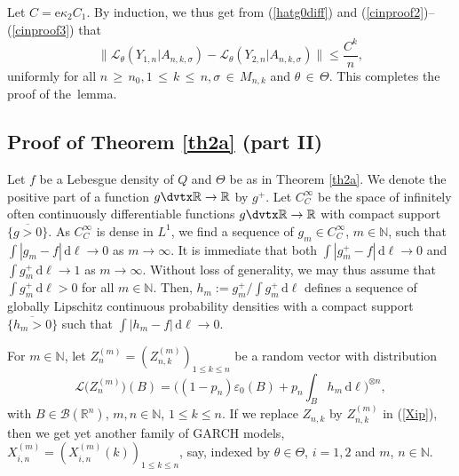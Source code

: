 \documentclass[number,citesort,seceqn,dvips]{arxbj}
\newcommand{\eqref}[1]{(\ref{#1})}
\newcommand{\RR}{\mathbb{R}}
\newcommand{\NN}{\mathbb{N}}
\newcommand{\BBB}{{\mathcal B}}
\newcommand{\LLL}{{\mathcal L}}
\begin{document}
\begin{pf}
Let $C=\mathrm{e} \kappa_2 C_1$. By induction, we thus get from
\eqref{hatg0diff} and \eqref{cinproof2}--\eqref{cinproof3} that
%
\[
\bigl \|\LLL_\theta (Y_{1,n} |A_{n,k,\sigma} )-\LLL
_\theta (Y_{2,n} |A_{n,k,\sigma} ) \bigr\|
\le\frac{C^k}{n} ,
\]
%
uniformly for all $n\,{\ge}\,n_0, 1\,{\le}\,k\,{\le}\,n, \sigma\,{\in}\,M_{n,k}$
and $\theta\,{\in}\,\Theta$. This completes the proof of the~lemma.\vspace*{-3pt}
\end{pf}

%

\subsection{\texorpdfstring{Proof of Theorem \protect\ref{th2a} (part II)}
{Proof of Theorem 2.2 (part II)}}\vspace*{-3pt}
\label{SUBSECproofThm2aPartII}
Let $f$ be a Lebesgue density of $Q$ and $\Theta$ be as in
Theorem \ref{th2a}. We denote the positive part of a function
$g\dvtx\RR\to\RR$ by $g^+$. Let $C^\infty_C$ be the space of infinitely
often continuously differentiable functions $g\dvtx\RR\to\RR$ with compact
support $\overline{\{g>0\}}$. As $C^\infty_C$ is dense in $L^1$, we
find a sequence of $g_m\in C_C^\infty$, $m\in\NN$, such that
$\int|g_m-f|\,\mathrm{d}\ell\to0$ as $m\to\infty$. It is immediate that both
$\int|g_m^+-f|\,\mathrm{d}\ell\to0$ and $\int g_m^+\,\mathrm{d}\ell\to1$ as $m\to
\infty$.
Without loss of generality, we may thus assume that $\int
g_m^+\,\mathrm{d}\ell>0$ for all $m\in\NN$. Then, $h_m:=g^+_m/\int g_m^+\,\mathrm{d}\ell$
defines a sequence of globally Lipschitz continuous probability
densities with a compact support $\overline{\{h_m>0\}}$ such that
$\int|h_m-f|\,\mathrm{d}\ell\to0$.

For $m\in\NN$, let $Z^{(m)}_n=(Z^{(m)}_{n,k})_{1\le k\le n}$ be a
random vector with distribution
%
\[
\LLL\bigl(Z^{(m)}_n\bigr)(B) =  \biggl((1 - p_n)\varepsilon_0(B)+p_n \int
_Bh_m\,\mathrm{d}\ell \biggr)^{\otimes n} ,
\]
%
with $B\in\BBB(\RR^n)$, $m,n\in\NN$, $1\le k\le n$. If we
replace $Z_{n,k}$ by $Z^{(m)}_{n,k}$ in \eqref{Xip}, then we get yet
another family of GARCH models, $X^{(m)}_{i,n}=(X^{(m)}_{i,n}(k))_{1\le
k\le n}$, say, indexed by $\theta\in\Theta$, $i=1,2$ and $m$,
$n\in\NN$.
\end{document}
